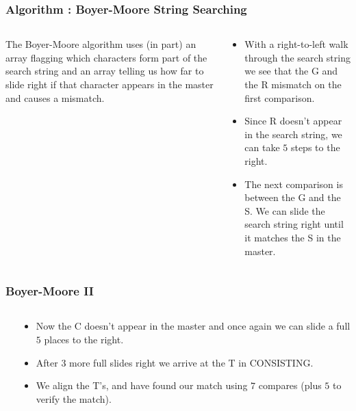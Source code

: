 \begin{frame}[fragile]
\frametitle{Algorithm : Boyer-Moore String Searching}
\begin{columns}[T]

\begin{column}{0.45\textwidth}
The Boyer-Moore algorithm uses (in part) an array flagging
which characters form part of the search string and an array telling
us how far to slide right if that character appears in the master and causes
a mismatch.

\end{column}

\pause
\begin{column}{0.45\textwidth}
\begin{itemize}[<+->]
\item With a right-to-left walk through the search string we see that the G and the R mismatch on the first comparison.
\item Since R doesn't appear in the
search string, we can take $5$ steps to the right.
\item The next comparison is between the G and the S. We can slide the search string right until it matches the S in the master.
\end{itemize}
\end{column}

\end{columns}
\end{frame}


\begin{frame}[fragile]
\frametitle{Boyer-Moore II}
\begin{columns}[T]

\begin{column}{0.45\textwidth}
\end{column}

\begin{column}{0.45\textwidth}
\begin{itemize}[<+->]
\item Now the C doesn't appear in the master and once again we can slide a full $5$ places to the right.
\item After $3$ more full slides right we arrive at the T in CONSISTING.
\item We align the T's, and have found our match using $7$ compares (plus $5$ to verify the match).
\end{itemize}
\end{column}

\end{columns}
\end{frame}

